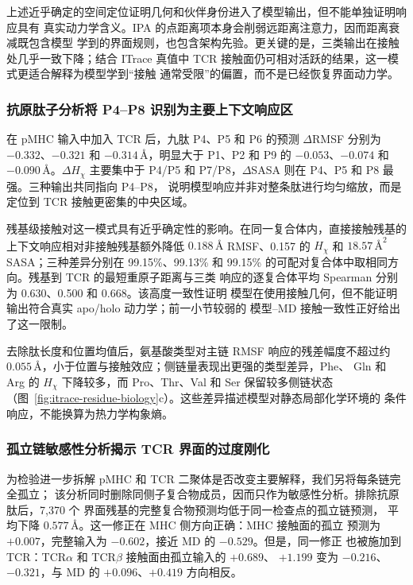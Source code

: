 上述近乎确定的空间定位证明几何和伙伴身份进入了模型输出，但不能单独证明响应具有
真实动力学含义。IPA 的点距离项本身会削弱远距离注意力，因而距离衰减既包含模型
学到的界面规则，也包含架构先验。更关键的是，三类输出在接触处几乎一致下降；结合
ITrace 真值中 TCR 接触面仍可相对活跃的结果，这一模式更适合解释为模型学到“接触
通常受限”的偏置，而不是已经恢复界面动力学。

\subsubsection{抗原肽子分析将 P4--P8 识别为主要上下文响应区}

在 pMHC 输入中加入 TCR 后，九肽 P4、P5 和 P6 的预测 $\Delta$RMSF 分别为
$-0.332$、$-0.321$ 和 $-0.314\,\text{\AA}$，明显大于 P1、P2 和 P9 的
$-0.053$、$-0.074$ 和 $-0.090\,\text{\AA}$。$\Delta H_\chi$ 主要集中于
P4/P5 和 P7/P8，$\Delta$SASA 则在 P4、P5 和 P8 最强。三种输出共同指向 P4--P8，
说明模型响应并非对整条肽进行均匀缩放，而是定位到 TCR 接触更密集的中央区域。

残基级接触对这一模式具有近乎确定性的影响。在同一复合体内，直接接触残基的
上下文响应相对非接触残基额外降低 $0.188\,\text{\AA}$ RMSF、0.157 的
$H_\chi$ 和 $18.57\,\text{\AA}^2$ SASA；三种差异分别在 99.15\%、99.13\%
和 99.15\% 的可配对复合体中取相同方向。残基到 TCR 的最短重原子距离与三类
响应的逐复合体平均 Spearman 分别为 0.630、0.500 和 0.668。该高度一致性证明
模型在使用接触几何，但不能证明输出符合真实 apo/holo 动力学；前一小节较弱的
模型--MD 接触一致性正好给出了这一限制。

去除肽长度和位置均值后，氨基酸类型对主链 RMSF 响应的残差幅度不超过约
$0.055\,\text{\AA}$，小于位置与接触效应；侧链量表现出更强的类型差异，Phe、
Gln 和 Arg 的 $H_\chi$ 下降较多，而 Pro、Thr、Val 和 Ser 保留较多侧链状态
（图~\ref{fig:itrace-residue-biology}c）。这些差异描述模型对静态局部化学环境的
条件响应，不能换算为热力学构象熵。

\subsubsection{孤立链敏感性分析揭示 TCR 界面的过度刚化}

为检验进一步拆解 pMHC 和 TCR 二聚体是否改变主要解释，我们另将每条链完全孤立；
该分析同时删除同侧子复合物成员，因而只作为敏感性分析。排除抗原肽后，7,370 个
界面残基的完整复合物预测均低于同一检查点的孤立链预测，
平均下降 $0.577\,\text{\AA}$。这一修正在 MHC 侧方向正确：MHC 接触面的孤立
预测为 $+0.007$，完整输入为 $-0.602$，接近 MD 的 $-0.529$。但是，同一修正
也被施加到 TCR：TCR$\alpha$ 和 TCR$\beta$ 接触面由孤立输入的 $+0.689$、
$+1.199$ 变为 $-0.216$、$-0.321$，与 MD 的 $+0.096$、$+0.419$ 方向相反。

